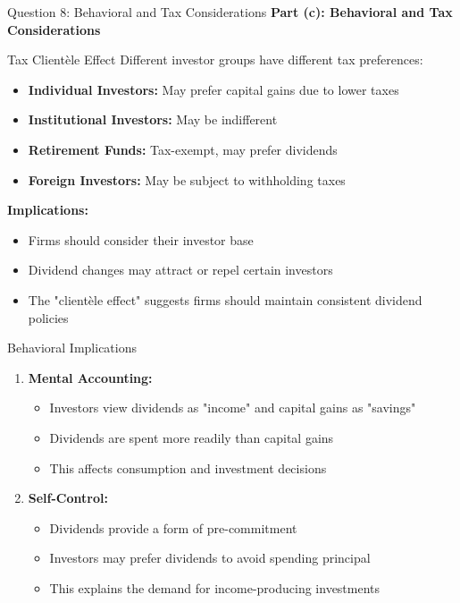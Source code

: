 \documentclass[aspectratio=169]{beamer}
\newcommand{\question}[1]{{\large\bfseries\color{crimson}#1}}
\begin{document}
	\begin{frame}{Question 8: Behavioral and Tax Considerations}
		\question{Part (c): Behavioral and Tax Considerations}
		
		\begin{block}{Tax Clientèle Effect}
			Different investor groups have different tax preferences:
			
			\begin{itemize}
				\item \textbf{Individual Investors:} May prefer capital gains due to lower taxes
				\item \textbf{Institutional Investors:} May be indifferent
				\item \textbf{Retirement Funds:} Tax-exempt, may prefer dividends
				\item \textbf{Foreign Investors:} May be subject to withholding taxes
			\end{itemize}
			
			\textbf{Implications:}
			\begin{itemize}
				\item Firms should consider their investor base
				\item Dividend changes may attract or repel certain investors
				\item The "clientèle effect" suggests firms should maintain consistent dividend policies
			\end{itemize}
			
			\begin{block}{Behavioral Implications}
				\begin{enumerate}
					\item \textbf{Mental Accounting:}
					\begin{itemize}
						\item Investors view dividends as "income" and capital gains as "savings"
						\item Dividends are spent more readily than capital gains
						\item This affects consumption and investment decisions
					\end{itemize}
					
					\item \textbf{Self-Control:}
					\begin{itemize}
						\item Dividends provide a form of pre-commitment
						\item Investors may prefer dividends to avoid spending principal
						\item This explains the demand for income-producing investments
					\end{itemize}
				\end{enumerate}
			\end{block}
		\end{block}
	\end{frame}
	
\end{document}
